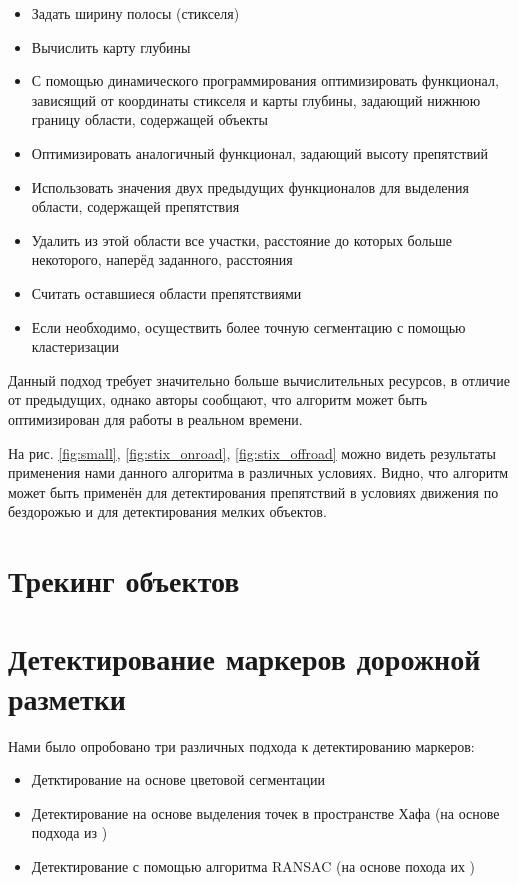 \documentclass[aps,%
14pt,%
final,%
oneside,
onecolumn,%
musixtex, %
superscriptaddress,%
centertags]{extarticle} %
\begin{document}
\begin{itemize}
     \item Задать ширину полосы (стикселя)
     \item Вычислить карту глубины
     \item С помощью динамического программирования оптимизировать функционал, зависящий от координаты стикселя и карты глубины, задающий нижнюю границу области, содержащей объекты
     \item Оптимизировать аналогичный функционал, задающий высоту препятствий
     \item Использовать значения двух предыдущих функционалов для выделения области, содержащей препятствия
     \item Удалить из этой области все участки, расстояние до которых больше некоторого, наперёд заданного, расстояния
    \item Считать оставшиеся области препятствиями
    \item Если необходимо, осуществить более точную сегментацию с помощью кластеризации
\end{itemize}

Данный подход требует значительно больше вычислительных ресурсов, в отличие от предыдущих, однако авторы \cite{benenson2011stixels} сообщают, что алгоритм может быть оптимизирован для работы в реальном времени.

На рис. \ref{fig:small}, \ref{fig:stix_onroad}, \ref{fig:stix_offroad} можно видеть результаты применения нами данного алгоритма в различных условиях. Видно, что алгоритм может быть применён для детектирования препятствий в условиях движения по бездорожью и для детектирования мелких объектов.

\section{Трекинг объектов}

\section{Детектирование маркеров дорожной разметки}
Нами было опробовано три различных подхода к детектированию маркеров:
\begin{itemize}
    \item Детктирование на основе цветовой сегментации
    \item Детектирование на основе выделения точек в пространстве Хафа (на основе подхода из \cite{song2017real} )
    \item Детектирование с помощью алгоритма RANSAC (на основе похода их \cite{aly2008real} )
\end{itemize}
\end{document}
